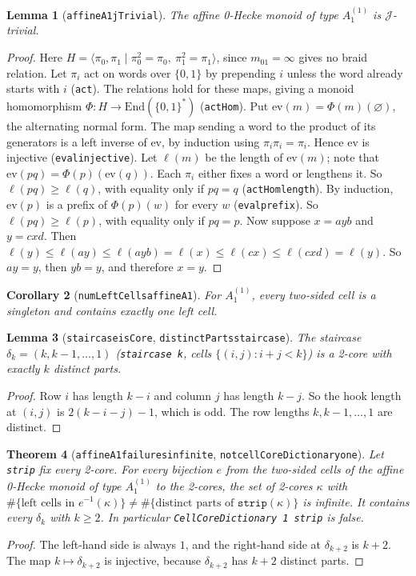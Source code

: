 \documentclass[11pt]{article}
\newtheorem{theorem}{Theorem}
\newtheorem{lemma}[theorem]{Lemma}
\newtheorem{corollary}[theorem]{Corollary}
\theoremstyle{definition}
\theoremstyle{remark}
\renewcommand{\_}{\oldus\allowbreak}
\begin{document}
\begin{lemma}[\texttt{affineA1\_jTrivial}]\label{lem:jtriv}
The affine 0-Hecke monoid of type $A_1^{(1)}$ is $\mathcal J$-trivial.
\end{lemma}
\begin{proof}
Here $H=\langle \pi_0,\pi_1\mid \pi_0^2=\pi_0,\ \pi_1^2=\pi_1\rangle$, since $m_{01}=\infty$ gives no braid
relation. Let $\pi_i$ act on words over $\{0,1\}$ by prepending $i$ unless the word already starts with
$i$ (\texttt{act}). The relations hold for these maps, giving a monoid homomorphism
$\Phi:H\to\mathrm{End}(\{0,1\}^*)$ (\texttt{actHom}). Put $\mathrm{ev}(m)=\Phi(m)(\varnothing)$, the
alternating normal form. The map sending a word to the product of its generators is a left inverse of
$\mathrm{ev}$, by induction using $\pi_i\pi_i=\pi_i$. Hence $\mathrm{ev}$ is injective
(\texttt{eval\_injective}). Let $\ell(m)$ be the length of $\mathrm{ev}(m)$; note that
$\mathrm{ev}(pq)=\Phi(p)(\mathrm{ev}(q))$. Each $\pi_i$ either fixes a word or lengthens it. So
$\ell(pq)\ge\ell(q)$, with equality only if $pq=q$ (\texttt{actHom\_length}). By induction, $\mathrm{ev}(p)$
is a prefix of $\Phi(p)(w)$ for every $w$ (\texttt{eval\_prefix}). So $\ell(pq)\ge\ell(p)$, with equality
only if $pq=p$. Now suppose $x=ayb$ and $y=cxd$. Then
$\ell(y)\le\ell(ay)\le\ell(ayb)=\ell(x)\le\ell(cx)\le\ell(cxd)=\ell(y)$. So $ay=y$, then $yb=y$, and
therefore $x=y$.
\end{proof}

\begin{corollary}[\texttt{numLeftCells\_affineA1}]
For $A_1^{(1)}$, every two-sided cell is a singleton and contains exactly one left cell.
\end{corollary}

\begin{lemma}[\texttt{staircase\_isCore}, \texttt{distinctParts\_staircase}]
The staircase $\delta_k=(k,k-1,\dots,1)$ (\texttt{staircase k}, cells $\{(i,j): i+j<k\}$) is a 2-core with
exactly $k$ distinct parts.
\end{lemma}
\begin{proof}
Row $i$ has length $k-i$ and column $j$ has length $k-j$. So the hook length at $(i,j)$ is
$2(k-i-j)-1$, which is odd. The row lengths $k,k-1,\dots,1$ are distinct.
\end{proof}

\begin{theorem}[\texttt{affineA1\_failures\_infinite}, \texttt{not\_cellCoreDictionary\_one}]\label{thm:one}
Let \texttt{strip} fix every 2-core. For every bijection $e$ from the two-sided cells of the affine 0-Hecke
monoid of type $A_1^{(1)}$ to the 2-cores, the set of 2-cores $\kappa$ with
$\#\{\text{left cells in } e^{-1}(\kappa)\}\ne\#\{\text{distinct parts of }\texttt{strip}(\kappa)\}$ is
infinite. It contains every $\delta_{k}$ with $k\ge2$. In particular \texttt{CellCoreDictionary 1 strip}
is false.
\end{theorem}
\begin{proof}
The left-hand side is always $1$, and the right-hand side at $\delta_{k+2}$ is $k+2$. The map
$k\mapsto\delta_{k+2}$ is injective, because $\delta_{k+2}$ has $k+2$ distinct parts.
\end{proof}
\end{document}
